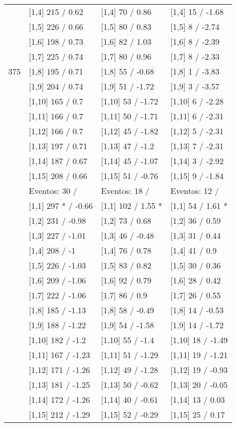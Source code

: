 \begin{table}
\begin{tabular}[t]{llll}
\addlinespace
 & {}[1,4] 215  / 0.62 & {}[1,4] 70  / 0.86 & {}[1,4] 15  / -1.68\\
 & {}[1,5] 226  / 0.66 & {}[1,5] 80  / 0.83 & {}[1,5] 8  / -2.74\\
 & {}[1,6] 198  / 0.73 & {}[1,6] 82  / 1.03 & {}[1,6] 8  / -2.39\\
 & {}[1,7] 225  / 0.74 & {}[1,7] 80  / 0.96 & {}[1,7] 8  / -2.33\\
375 & {}[1,8] 195  / 0.71 & {}[1,8] 55  / -0.68 & {}[1,8] 1  / -3.83\\
\addlinespace
 & {}[1,9] 204  / 0.74 & {}[1,9] 51  / -1.72 & {}[1,9] 3  / -3.57\\
 & {}[1,10] 165  / 0.7 & {}[1,10] 53  / -1.72 & {}[1,10] 6  / -2.28\\
 & {}[1,11] 166  / 0.7 & {}[1,11] 50  / -1.71 & {}[1,11] 6  / -2.31\\
 & {}[1,12] 166  / 0.7 & {}[1,12] 45  / -1.82 & {}[1,12] 5  / -2.31\\
 & {}[1,13] 197  / 0.71 & {}[1,13] 47  / -1.2 & {}[1,13] 7  / -2.31\\
\addlinespace
 & {}[1,14] 187  / 0.67 & {}[1,14] 45  / -1.07 & {}[1,14] 3  / -2.92\\
 & {}[1,15] 208  / 0.66 & {}[1,15] 51  / -0.76 & {}[1,15] 9  / -1.84\\
 & Eventos:  30 / & Eventos:  18 / & Eventos:  12 /\\
 & {}[1,1] 297 * / -0.66 & {}[1,1] 102  / 1.55 * & {}[1,1] 54  / 1.61 *\\
 & {}[1,2] 231  / -0.98 & {}[1,2] 73  / 0.68 & {}[1,2] 36  / 0.59\\
\addlinespace
 & {}[1,3] 227  / -1.01 & {}[1,3] 46  / -0.48 & {}[1,3] 31  / 0.44\\
 & {}[1,4] 208  / -1 & {}[1,4] 76  / 0.78 & {}[1,4] 41  / 0.9\\
 & {}[1,5] 226  / -1.03 & {}[1,5] 83  / 0.82 & {}[1,5] 30  / 0.36\\
 & {}[1,6] 209  / -1.06 & {}[1,6] 92  / 0.79 & {}[1,6] 28  / 0.42\\
 & {}[1,7] 222  / -1.06 & {}[1,7] 86  / 0.9 & {}[1,7] 26  / 0.55\\
\addlinespace
500 & {}[1,8] 185  / -1.13 & {}[1,8] 58  / -0.49 & {}[1,8] 14  / -0.53\\
 & {}[1,9] 188  / -1.22 & {}[1,9] 54  / -1.58 & {}[1,9] 14  / -1.72\\
 & {}[1,10] 182  / -1.2 & {}[1,10] 55  / -1.4 & {}[1,10] 18  / -1.49\\
 & {}[1,11] 167  / -1.23 & {}[1,11] 51  / -1.29 & {}[1,11] 19  / -1.21\\
 & {}[1,12] 171  / -1.26 & {}[1,12] 49  / -1.28 & {}[1,12] 19  / -0.93\\
\addlinespace
 & {}[1,13] 181  / -1.25 & {}[1,13] 50  / -0.62 & {}[1,13] 20  / -0.05\\
 & {}[1,14] 172  / -1.26 & {}[1,14] 40  / -0.61 & {}[1,14] 13  / 0.03\\
 & {}[1,15] 212  / -1.29 & {}[1,15] 52  / -0.29 & {}[1,15] 25  / 0.17\\
\bottomrule
\end{tabular}
\end{table}
